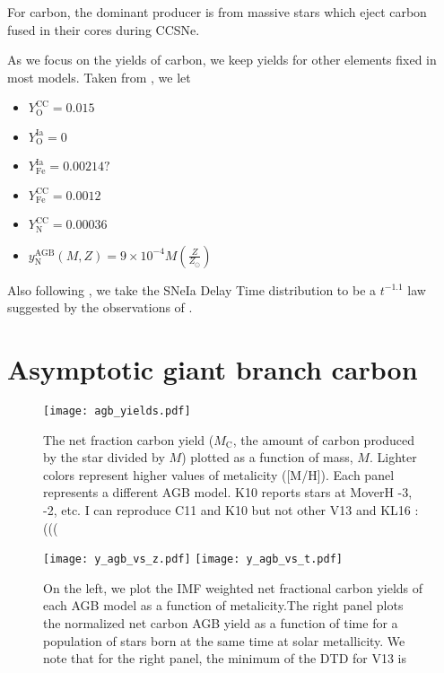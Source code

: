 \documentclass[12pt,oneside]{book}
\begin{document}
For carbon, the dominant producer is from massive stars which eject carbon fused in their cores during CCSNe. 

As we focus on the yields of carbon, we keep yields for other elements fixed in
most models. Taken from \citet{james+21, james+22}, we let
\begin{itemize}
    \item $Y_\text{O}^\text{CC} = 0.015$
    \item $Y_\text{O}^\text{Ia} = 0$
    \item $Y_\text{Fe}^\text{Ia} = 0.00214?$
    \item $Y_\text{Fe}^\text{CC} = 0.0012$
    \item $Y_\text{N}^\text{CC} = 0.00036$
    \item $y_\text{N}^\text{AGB}(M, Z) = 9\times 10^{-4} M \left(\frac{Z}{Z_\odot}\right)$
\end{itemize}
Also following \citet{james+21, james+22}, we take the SNeIa Delay Time distribution to be a
$t^{-1.1}$ law suggested by the observations of \citet{maoz+12}.


\section{Asymptotic giant branch carbon}

\begin{figure*}
    \centering
 	    \texttt{[image: agb\_yields.pdf]}\\

    \caption{The net fraction carbon yield ($M_\text{C}$, the amount of carbon produced by the star divided by $M$) plotted as a function of mass, $M$. Lighter colors represent higher values of metalicity ([M/H]). Each panel represents a different AGB model. K10 reports stars at MoverH -3, -2, etc. I can reproduce C11 and K10 but not other V13 and KL16 :(((}

    \label{fig:y_agb}
\end{figure*}

\begin{figure*}
    \centering
    
    \texttt{[image: y\_agb\_vs\_z.pdf]}
    \texttt{[image: y\_agb\_vs\_t.pdf]}

    \caption{On the left, we plot the IMF weighted net fractional carbon yields of each AGB model as a function of metalicity.The right panel plots the normalized net carbon AGB yield as a function of time for a population of stars born at the same time at solar metallicity. We note that for the right panel, the minimum of the DTD for V13 is }

\end{figure*}
\end{document}
